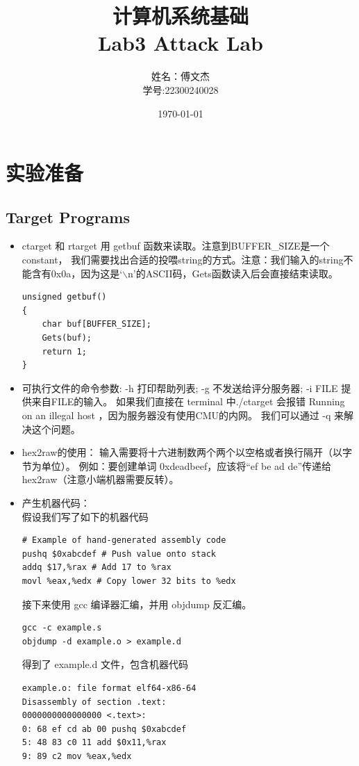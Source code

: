 \documentclass[12pt, a4paper, oneside]{ctexart}
\title{计算机系统基础 \\ Lab3 Attack Lab} %
\author{姓名：傅文杰\\学号:22300240028} %
\date{\today} %
\begin{document}
\maketitle %

\tableofcontents %

\section{实验准备} %

\subsection{Target Programs}
\begin{itemize}
    \item ctarget 和 rtarget 用 getbuf 函数来读取。注意到BUFFER\_SIZE是一个constant，
    我们需要找出合适的投喂string的方式。注意：我们输入的string不能含有0x0a，因为这是‘$\backslash$n’的ASCII码，Gets函数读入后会直接结束读取。
\begin{lstlisting}
unsigned getbuf()
{
    char buf[BUFFER_SIZE];
    Gets(buf);
    return 1;
}
\end{lstlisting}
    \item 可执行文件的命令参数: -h 打印帮助列表; -g 不发送给评分服务器; -i FILE 提供来自FILE的输入。
    如果我们直接在 terminal 中./ctarget 会报错 Running on an illegal host ，因为服务器没有使用CMU的内网。
    我们可以通过 -q 来解决这个问题。
    \item hex2raw的使用： 输入需要将十六进制数两个两个以空格或者换行隔开（以字节为单位）。
    例如：要创建单词 0xdeadbeef，应该将“ef be ad de”传递给 hex2raw（注意小端机器需要反转）。
    \item 产生机器代码：\\
    假设我们写了如下的机器代码
\begin{lstlisting}
# Example of hand-generated assembly code
pushq $0xabcdef # Push value onto stack
addq $17,%rax # Add 17 to %rax
movl %eax,%edx # Copy lower 32 bits to %edx
\end{lstlisting}
    接下来使用 gcc 编译器汇编，并用 objdump 反汇编。
\begin{lstlisting}
gcc -c example.s
objdump -d example.o > example.d
\end{lstlisting}
    得到了 example.d 文件，包含机器代码
\begin{lstlisting}
example.o: file format elf64-x86-64
Disassembly of section .text:
0000000000000000 <.text>:
0: 68 ef cd ab 00 pushq $0xabcdef
5: 48 83 c0 11 add $0x11,%rax
9: 89 c2 mov %eax,%edx
\end{lstlisting}
\end{itemize}
\end{document}
